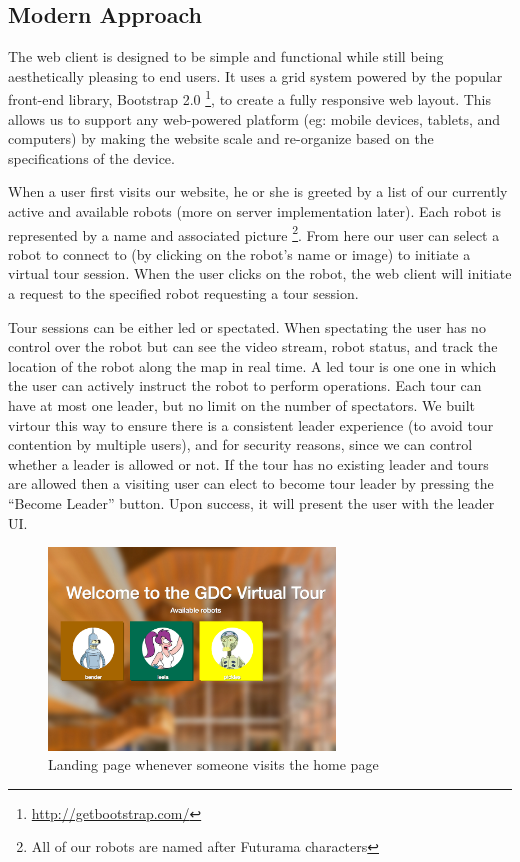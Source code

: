 \documentclass[
  oneside,
  11pt, a4paper,
  footinclude=true,
  headinclude=true,
  cleardoublepage=empty
]{article}
\begin{document}
\subsection{Modern Approach}

The web client is designed to be simple and functional while still being
aesthetically pleasing to end users. It uses a grid system powered by the
popular front-end library, Bootstrap 2.0
\footnote{\url{http://getbootstrap.com/}}, to create a fully
responsive web layout. This allows us to support any web-powered platform (eg:
mobile devices, tablets, and computers) by making the website scale and
re-organize based on the specifications of the device.

When a user first visits our website, he or she is greeted by a list of our
currently active and available robots (more on server implementation later).
Each robot is represented by a name and associated picture \footnote{All of our
robots are named after Futurama characters}. From here our user can select a
robot to connect to (by clicking on the robot's name or image) to initiate a
virtual tour session. When the user clicks on the robot, the web client will
initiate a request to the specified robot requesting a tour session.

Tour sessions can be either led or spectated. When spectating the user has no
control over the robot but can see the video stream, robot status, and track
the location of the robot along the map in real time. A led tour is one one in
which the user can actively instruct the robot to perform operations. Each tour
can have at most one leader, but no limit on the number of spectators. We built
virtour this way to ensure there is a consistent leader experience (to avoid tour
contention by multiple users), and for security reasons, since we can control
whether a leader is allowed or not. If the tour has no existing leader and
tours are allowed then a visiting user can elect to become tour leader by
pressing the ``Become Leader'' button. Upon success, it will present the user
with the leader UI.

\begin{figure}
\centering
\includegraphics[width=3in]{tour_homepage}
\caption{Landing page whenever someone visits the home page}
\end{figure}
\end{document}
